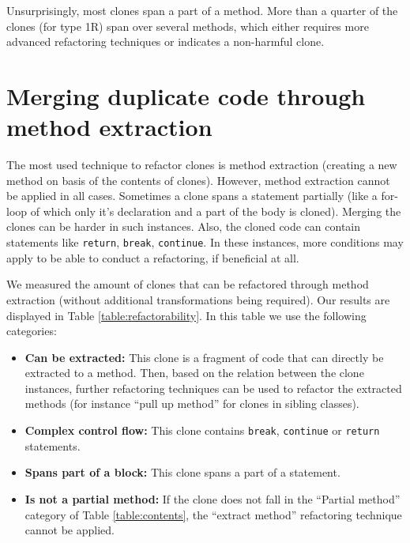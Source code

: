 \documentclass[a4paper]{article}
\begin{document}
Unsurprisingly, most clones span a part of a method. More than a quarter of the clones (for type 1R) span over several methods, which either requires more advanced refactoring techniques or indicates a non-harmful clone.

\section{Merging duplicate code through method extraction}\label{chap:mergingdups}
The most used technique to refactor clones is method extraction (creating a new method on basis of the contents of clones). However, method extraction cannot be applied in all cases. Sometimes a clone spans a statement partially (like a for-loop of which only it's declaration and a part of the body is cloned). Merging the clones can be harder in such instances. Also, the cloned code can contain statements like \texttt{return}, \texttt{break}, \texttt{continue}. In these instances, more conditions may apply to be able to conduct a refactoring, if beneficial at all.

We measured the amount of clones that can be refactored through method extraction (without additional transformations being required). Our results are displayed in Table \ref{table:refactorability}. In this table we use the following categories:
\begin{itemize}
    \item \textbf{Can be extracted:} This clone is a fragment of code that can directly be extracted to a method. Then, based on the relation between the clone instances, further refactoring techniques can be used to refactor the extracted methods (for instance ``pull up method'' for clones in sibling classes).
    \item \textbf{Complex control flow:} This clone contains \texttt{break}, \texttt{continue} or \texttt{return} statements.
    \item \textbf{Spans part of a block:} This clone spans a part of a statement.
    \item \textbf{Is not a partial method:} If the clone does not fall in the ``Partial method'' category of Table \ref{table:contents}, the ``extract method'' refactoring technique cannot be applied.
\end{itemize}
\end{document}
